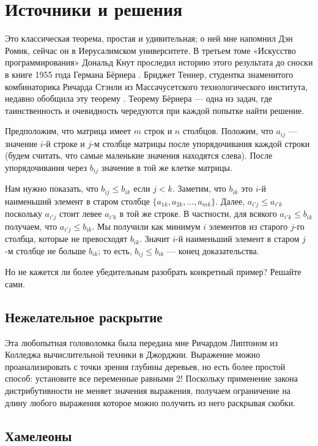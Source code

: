 \section*{Источники и решения}

Это классическая теорема, простая и удивительная; о ней мне напомнил Дэн Ромик, сейчас он в Иерусалимском университете.
В третьем томе «Искусство программирования» \cite{} Дональд Кнут проследил историю этого результата до сноски в книге 1955 года Германа Бёрнера \cite{}.
Бриджет Теннер, студентка знаменитого комбинаторика Ричарда Стэнли из Массачусетского технологического института, недавно обобщила эту теорему \cite{}.
Теорему Бёрнера --- одна из задач, где таинственность и очевидность чередуются при каждой попытке найти решение.

Предположим, что матрица имеет $m$ строк и $n$ столбцов.
Положим, что $a_{ij}$ --- значение $i$-й строке и $j$-м столбце матрицы
после упорядочивания каждой строки (будем считать, что самые маленькие значения находятся слева).
После упорядочивания через $b_{ij}$ значение в той же клетке матрицы.

Нам нужно показать, что $b_{ij} \le b_{ik}$ если $j < k$.
Заметим, что $b_{ik}$ это $i$-й наименьший элемент в старом столбце $\{a_{1k}, a_{2k}, \dots, a_{mk}\}$.
Далее, $a_{i'j}\le a_{i'k}$ поскольку $a_{i'j}$ стоит левее $a_{i'k}$ в той же строке.
В частности, для всякого $a_{i'k}\le b_{ik}$ получаем, что $a_{i'j}\le b_{ik}$.
Мы получили как минимум $i$ элементов из старого $j$-го столбца, которые не превосходят $b_{ik}$.
Значит $i$-й наименьший элемент в старом $j$-м столбце не больше $b_{ik}$;
то есть, $b_{ij} \le b_{ik}$ --- конец доказательства.

Но не кажется ли более убедительным разобрать конкретный пример?
Решайте сами.

\subsection*{Нежелательное раскрытие}

Эта любопытная головоломка была передана мне Ричардом Липтоном из Колледжа вычислительной техники в Джорджии.
Выражение можно проанализировать с точки зрения глубины деревьев, но есть более простой способ:
установите все переменные равными 2!
Поскольку применение закона дистрибутивности не меняет значения выражения,
получаем ограничение на длину любого выражения которое можно получить из него раскрывая скобки.

\subsection*{Хамелеоны}

